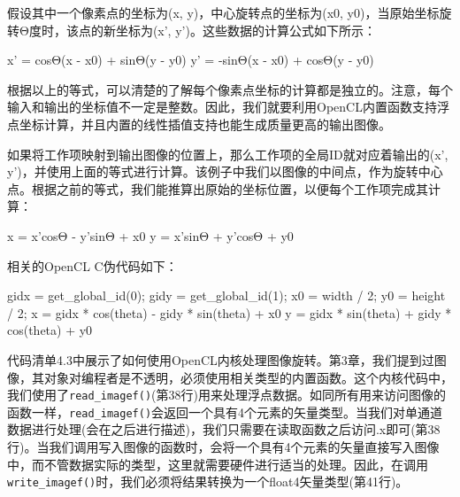 假设其中一个像素点的坐标为(x, y)，中心旋转点的坐标为(x0, y0)，当原始坐标旋转Θ度时，该点的新坐标为(x', y')。这些数据的计算公式如下所示：

\begin{codebox}[text]
x' = cosΘ(x - x0) + sinΘ(y - y0)
y' = -sinΘ(x - x0) + cosΘ(y - y0)
\end{codebox}

根据以上的等式，可以清楚的了解每个像素点坐标的计算都是独立的。注意，每个输入和输出的坐标值不一定是整数。因此，我们就要利用OpenCL内置函数支持浮点坐标计算，并且内置的线性插值支持也能生成质量更高的输出图像。

如果将工作项映射到输出图像的位置上，那么工作项的全局ID就对应着输出的(x', y')，并使用上面的等式进行计算。该例子中我们以图像的中间点，作为旋转中心点。根据之前的等式，我们能推算出原始的坐标位置，以便每个工作项完成其计算：

\begin{codebox}[text]
x = x'cosΘ - y'sinΘ + x0
y = x'sinΘ + y'cosΘ + y0
\end{codebox}

相关的OpenCL C伪代码如下：

\begin{codebox}[cpp]
gidx = get_global_id(0);
gidy = get_global_id(1);
x0 = width / 2;
y0 = height / 2;
x = gidx * cos(theta) - gidy * sin(theta) + x0
y = gidx * sin(theta) + gidy * cos(theta) + y0
\end{codebox}

代码清单4.3中展示了如何使用OpenCL内核处理图像旋转。第3章，我们提到过图像，其对象对编程者是不透明，必须使用相关类型的内置函数。这个内核代码中，我们使用了\texttt{read\_imagef()}(第38行)用来处理浮点数据。如同所有用来访问图像的函数一样，\texttt{read\_imagef()}会返回一个具有4个元素的矢量类型。当我们对单通道数据进行处理(会在之后进行描述)，我们只需要在读取函数之后访问.x即可(第38行)。当我们调用写入图像的函数时，会将一个具有4个元素的矢量直接写入图像中，而不管数据实际的类型，这里就需要硬件进行适当的处理。因此，在调用\texttt{write\_imagef()}时，我们必须将结果转换为一个float4矢量类型(第41行)。

